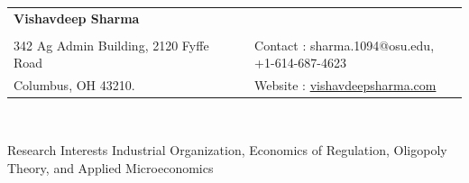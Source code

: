 \documentclass{resume} %
\begin{document}
\begin{minipage}[c]{0.12\linewidth}
\end{minipage}
{
\begin{tabular}{ p{0.53\linewidth} p{0.54\linewidth} }
\hspace*{-2.5mm}\Huge\textbf{Vishavdeep Sharma} & \hspace*{-1mm}\\\\
\hspace*{-2.5mm} 342 Ag Admin Building, 2120 Fyffe Road & \hspace*{-10mm} Contact : sharma.1094@osu.edu, +1-614-687-4623\\
\hspace*{-2.5mm}  Columbus, OH 43210.  & \hspace*{-10mm} Website : \href{https://vishavdeepsharma.com/}{vishavdeepsharma.com}
\end{tabular}
}
\\
\vspace{-1em}





\vspace{4pt}
\begin{rSection}{Research Interests}{}{}
Industrial Organization, Economics of Regulation, Oligopoly Theory, and Applied Microeconomics
\end{rSection}
\end{document}
